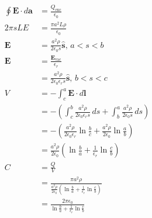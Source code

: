 \documentclass{article}
\renewcommand{\vec}[1]{\boldsymbol{\mathbf{#1}}}
\newcommand{\uvec}[1]{\hat{\vec{#1}}}
\begin{document}
\begin{align*}
  \oint \vec{E} \cdot d \vec{a} & = \frac{Q_\text{enc}}{\epsilon_0}                                                                                            \\
  2 \pi s L E                   & = \frac{\pi a^2 L \rho}{\epsilon_0}                                                                                          \\
  \vec{E}                       & = \frac{a^2 \rho}{2 \epsilon_0 s} \uvec{s}, \,a < s < b                                                                      \\
  \vec{E}                       & = \frac{\vec{E}_\text{vac}}{\epsilon_r}                                                                                      \\
                                & = \frac{a^2 \rho}{2 \epsilon_0 \epsilon_r s} \uvec{s}, \,b < s < c                                                           \\
  V                             & = -\int_c^a \vec{E} \cdot d \vec{l}                                                                                          \\
                                & = -\left( \int_c^b \frac{a^2 \rho}{2 \epsilon_0 \epsilon_r s} \,d s + \int_b^a \frac{a^2 \rho}{2 \epsilon_0 s} \,d s \right) \\
                                & = -\left( \frac{a^2 \rho}{2 \epsilon_0 \epsilon_r} \ln \frac{b}{c} + \frac{a^2 \rho}{2 \epsilon_0} \ln \frac{a}{b} \right)   \\
                                & = \frac{a^2 \rho}{2 \epsilon_0} \left( \ln \frac{b}{a} + \frac{1}{\epsilon_r} \ln \frac{c}{b} \right)                        \\
  C                             & = \frac{Q}{V}                                                                                                                \\
                                & = \frac{\pi a^2 \rho}{\frac{a^2 \rho}{2 \epsilon_0} \left( \ln \frac{b}{a} + \frac{1}{\epsilon_r} \ln \frac{c}{b} \right)}   \\
                                & = \frac{2 \pi \epsilon_0}{\ln \frac{b}{a} + \frac{1}{\epsilon_r} \ln \frac{c}{b}}
\end{align*}
\end{document}
